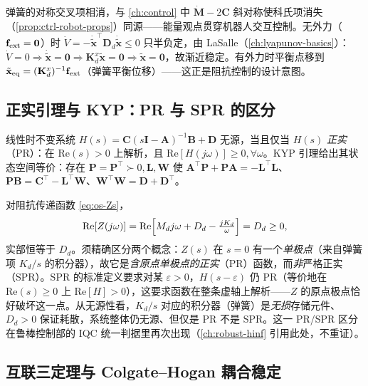 弹簧的对称交叉项相消，与 \cref{ch:control} 中 $\dot{\mathbf M}-2\mathbf C$ 斜对称使科氏项消失（\cref{prop:ctrl-robot-props}）同源——能量观点贯穿机器人交互控制。无外力（$\mathbf f_{\rm ext}=\mathbf 0$）时 $\dot V=-\dot{\tilde{\mathbf x}}^\top\mathbf D_d\dot{\tilde{\mathbf x}}\le0$ 只半负定，由 LaSalle（\cref{ch:lyapunov-basics}）：$\dot V=0\Rightarrow\dot{\tilde{\mathbf x}}=\mathbf 0\Rightarrow\mathbf K_d^x\tilde{\mathbf x}=\mathbf 0\Rightarrow\tilde{\mathbf x}=\mathbf 0$，故渐近稳定。有外力时平衡点移到 $\tilde{\mathbf x}_{\rm eq}=(\mathbf K_d^x)^{-1}\mathbf f_{\rm ext}$（弹簧平衡位移）——这正是阻抗控制的设计意图。

\subsection{正实引理与 KYP：PR 与 SPR 的区分}
\label{sec:os-positive-real}

\begin{theorem}
\label{thm:os-kyp}
线性时不变系统 $H(s)=\mathbf C(s\mathbf I-\mathbf A)^{-1}\mathbf B+\mathbf D$ 无源，当且仅当 $H(s)$ \emph{正实}（PR）：在 $\mathrm{Re}(s)>0$ 上解析，且 $\mathrm{Re}[H(j\omega)]\ge0,\forall\omega$。KYP 引理给出其状态空间等价：存在 $\mathbf P=\mathbf P^\top\succ0,\mathbf L,\mathbf W$ 使 $\mathbf A^\top\mathbf P+\mathbf P\mathbf A=-\mathbf L^\top\mathbf L$、$\mathbf P\mathbf B=\mathbf C^\top-\mathbf L^\top\mathbf W$、$\mathbf W^\top\mathbf W=\mathbf D+\mathbf D^\top$。
\end{theorem}

对阻抗传递函数 \cref{eq:os-Zs}，
\begin{equation}
  \mathrm{Re}[Z(j\omega)]=\mathrm{Re}\Bigl[M_d j\omega+D_d-\tfrac{jK_d}{\omega}\Bigr]=D_d\ge0,
  \label{eq:os-ReZ}
\end{equation}
实部恒等于 $D_d$。须精确区分两个概念：$Z(s)$ 在 $s=0$ 有一个\emph{单极点}（来自弹簧项 $K_d/s$ 的积分器），故它是\emph{含原点单极点的正实}（PR）函数，而\emph{非}严格正实（SPR）。SPR 的标准定义要求对某 $\varepsilon>0$，$H(s-\varepsilon)$ 仍 PR（等价地在 $\mathrm{Re}(s)\ge0$ 上 $\mathrm{Re}[H]>0$），这要求函数在整条虚轴上解析——$Z$ 的原点极点恰好破坏这一点。从无源性看，$K_d/s$ 对应的积分器（弹簧）是\emph{无损}存储元件、$D_d>0$ 保证耗散，系统整体仍无源、但仅是 PR 不是 SPR。这一 PR/SPR 区分在鲁棒控制部的 IQC 统一判据里再次出现（\cref{ch:robust-hinf} 引用此处，不重证）。

\subsection{互联三定理与 Colgate--Hogan 耦合稳定}
\label{sec:os-interconnection}

